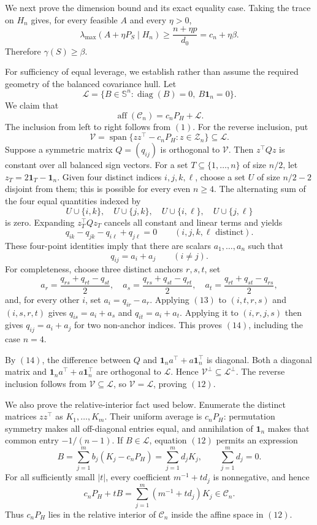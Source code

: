 We next prove the dimension bound and its exact equality case. Taking the trace on \(H_n\) gives, for every feasible \(A\) and every \(\eta>0\),
\[
\lambda_{\max}(A+\eta P_S\mid H_n)
\geq \frac{n+\eta p}{d_0}
=c_n+\eta\beta.
\tag{10}
\]
Therefore \(\gamma(S)\geq\beta\).

For sufficiency of equal leverage, we establish rather than assume the required geometry of the balanced covariance hull. Let
\[
\mathcal L
=\{B\in\mathbb S^n:\operatorname{diag}(B)=0,\ B\mathbf1_n=0\}.
\tag{11}
\]
We claim that
\[
\operatorname{aff}(\mathcal C_n)=c_nP_H+\mathcal L.
\tag{12}
\]
The inclusion from left to right follows from \((1)\). For the reverse inclusion, put
\[
\mathcal V=\operatorname{span}\{zz^\top-c_nP_H:z\in\mathcal Z_n\}\subseteq\mathcal L.
\]
Suppose a symmetric matrix \(Q=(q_{ij})\) is orthogonal to \(\mathcal V\). Then \(z^\top Qz\) is constant over all balanced sign vectors. For a set \(T\subseteq\{1,\ldots,n\}\) of size \(n/2\), let \(z_T=2\mathbf1_T-\mathbf1_n\). Given four distinct indices \(i,j,k,\ell\), choose a set \(U\) of size \(n/2-2\) disjoint from them; this is possible for every even \(n\geq4\). The alternating sum of the four equal quantities indexed by
\[
U\cup\{i,k\},\quad U\cup\{j,k\},\quad
U\cup\{i,\ell\},\quad U\cup\{j,\ell\}
\]
is zero. Expanding \(z_T^\top Qz_T\) cancels all constant and linear terms and yields
\[
q_{ik}-q_{jk}-q_{i\ell}+q_{j\ell}=0
\qquad(i,j,k,\ell\text{ distinct}).
\tag{13}
\]
These four-point identities imply that there are scalars \(a_1,\ldots,a_n\) such that
\[
q_{ij}=a_i+a_j\qquad(i\neq j).
\tag{14}
\]
For completeness, choose three distinct anchors \(r,s,t\), set
\[
a_r=\frac{q_{rs}+q_{rt}-q_{st}}2,
\quad
a_s=\frac{q_{rs}+q_{st}-q_{rt}}2,
\quad
a_t=\frac{q_{rt}+q_{st}-q_{rs}}2,
\]
and, for every other \(i\), set \(a_i=q_{ir}-a_r\). Applying \((13)\) to \((i,t,r,s)\) and \((i,s,r,t)\) gives \(q_{is}=a_i+a_s\) and \(q_{it}=a_i+a_t\). Applying it to \((i,r,j,s)\) then gives \(q_{ij}=a_i+a_j\) for two non-anchor indices. This proves \((14)\), including the case \(n=4\).

By \((14)\), the difference between \(Q\) and \(\mathbf1_na^\top+a\mathbf1_n^\top\) is diagonal. Both a diagonal matrix and \(\mathbf1_na^\top+a\mathbf1_n^\top\) are orthogonal to \(\mathcal L\). Hence \(\mathcal V^\perp\subseteq\mathcal L^\perp\). The reverse inclusion follows from \(\mathcal V\subseteq\mathcal L\), so \(\mathcal V=\mathcal L\), proving \((12)\).

We also prove the relative-interior fact used below. Enumerate the distinct matrices \(z z^\top\) as \(K_1,\ldots,K_m\). Their uniform average is \(c_nP_H\): permutation symmetry makes all off-diagonal entries equal, and annihilation of \(\mathbf1_n\) makes that common entry \(-1/(n-1)\). If \(B\in\mathcal L\), equation \((12)\) permits an expression
\[
B=\sum_{j=1}^m b_j(K_j-c_nP_H)
=\sum_{j=1}^m d_jK_j,
\qquad \sum_{j=1}^m d_j=0.
\]
For all sufficiently small \(|t|\), every coefficient \(m^{-1}+td_j\) is nonnegative, and hence
\[
c_nP_H+tB=\sum_{j=1}^m(m^{-1}+td_j)K_j\in\mathcal C_n.
\tag{15}
\]
Thus \(c_nP_H\) lies in the relative interior of \(\mathcal C_n\) inside the affine space in \((12)\).

